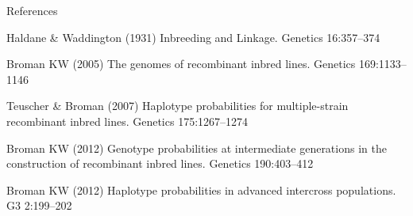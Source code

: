 \documentclass[aspectratio=169,12pt,t]{beamer}
\begin{document}
\begin{frame}[c]{References}

  \bbi

  \item Haldane \& Waddington (1931) Inbreeding and Linkage.
    Genetics 16:357--374

  \item Broman KW (2005) The genomes of recombinant inbred lines. Genetics 169:1133--1146

  \item Teuscher \& Broman (2007) Haplotype probabilities for
    multiple-strain recombinant inbred lines. Genetics 175:1267--1274

  \item Broman KW (2012) Genotype probabilities at intermediate
    generations in the construction of recombinant inbred lines.
    Genetics 190:403--412

  \item Broman KW (2012) Haplotype probabilities in advanced
    intercross populations. G3 2:199--202

  \ei



\end{frame}
\end{document}
